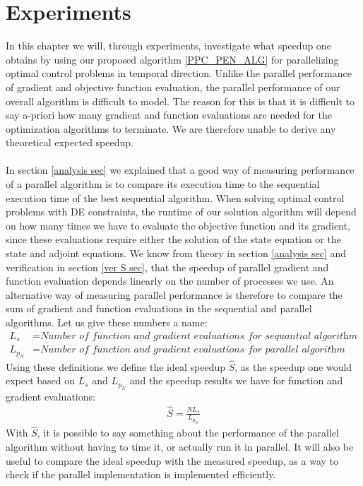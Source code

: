 \chapter{Experiments}\label{Experiments chapter}
In this chapter we will, through experiments, investigate what speedup one obtains by using our proposed algorithm \ref{PPC_PEN_ALG} for parallelizing optimal control problems in temporal direction. Unlike the parallel performance of gradient and objective function evaluation, the parallel performance of our overall algorithm is difficult to model. The reason for this is that it is difficult to say a-priori how many gradient and function evaluations are needed for the optimization algorithms to terminate. We are therefore unable to derive any theoretical expected speedup.
\\
\\
In section \ref{analysis sec} we explained that a good way of measuring performance of a parallel algorithm is to compare its execution time to the sequential execution time of the best sequential algorithm. When solving optimal control problems with DE constraints, the runtime of our solution algorithm will depend on how many times we have to evaluate the objective function and its gradient, since these evaluations require either the solution of the state equation or the state and adjoint equations. We know from theory in section \ref{analysis sec} and verification in section \ref{ver S sec}, that the speedup of parallel gradient and function evaluation depends linearly on the number of processes we use. An alternative way of measuring parallel performance is therefore to compare the sum of gradient and function evaluations in the sequential and parallel algorithms. Let us give these numbers a name:
\begin{align*}
L_s &= \textit{Number of function and gradient evaluations for sequantial algorithm}\\
L_{p_N} &= \textit{Number of function and gradient evaluations for parallel algorithm using N processes}
\end{align*} 
Using these definitions we define the ideal speedup $\hat{S}$, as the speedup one would expect based on $L_s$ and $L_{p_N}$ and the speedup results we have for function and gradient evaluations:
\begin{align}
\hat S = \frac{NL_s}{L_{p_N}} \label{ideal S}
\end{align}
With $\hat S$, it is possible to say something about the performance of the parallel algorithm without having to time it, or actually run it in parallel. It will also be useful to compare the ideal speedup with the measured speedup, as a way to check if the parallel implementation is implemented efficiently.
